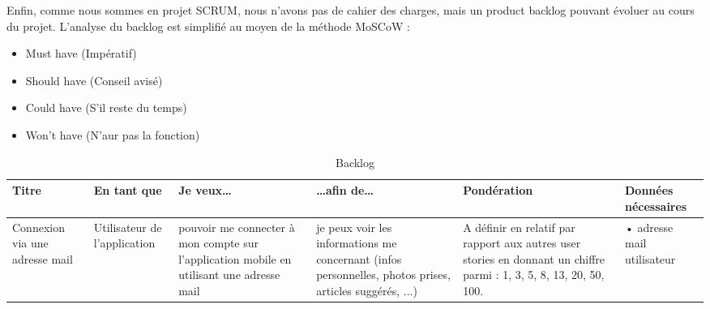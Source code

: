 \documentclass[12pt]{article}
\begin{document}
Enfin, comme nous sommes en projet SCRUM, nous n’avons pas de cahier des charges, mais un product backlog pouvant évoluer au cours du projet. L’analyse du backlog est simplifié au moyen de la méthode MoSCoW :
\begin{itemize}
	\item Must have (Impératif)
	\item Should have (Conseil avisé)
	\item Could have (S’il reste du temps)
	\item Won’t have (N’aur pas la fonction)
\end{itemize}
\begin{landscape}
\begin{table}[H]
\scriptsize
\caption{Backlog}
\begin{tabular}{p{3cm}p{3cm}p{4cm}p{4cm}p{4cm}p{4cm}}
\hline  Titre	\cellcolor{gray!50}&En tant que \cellcolor{gray!50}& Je veux\dots\cellcolor{gray!50}&  \dots afin de\dots\cellcolor{gray!50}& \bf Pondération\cellcolor{gray!50} & \bf Données nécessaires\cellcolor{gray!50} \\
\hline  Connexion via une adresse mail& 
Utilisateur de l'application &
  pouvoir me connecter à mon compte sur l'application mobile en utilisant une adresse mail& je peux voir les informations me concernant (infos personnelles, photos prises, articles suggérés, ...)& 
  A définir en relatif par rapport aux autres user stories en donnant un chiffre parmi : 1, 3, 5, 8, 13, 20, 50, 100.&
{•} adresse mail utilisateur


\end{tabular}
\end{table}
\end{landscape}
\end{document}
